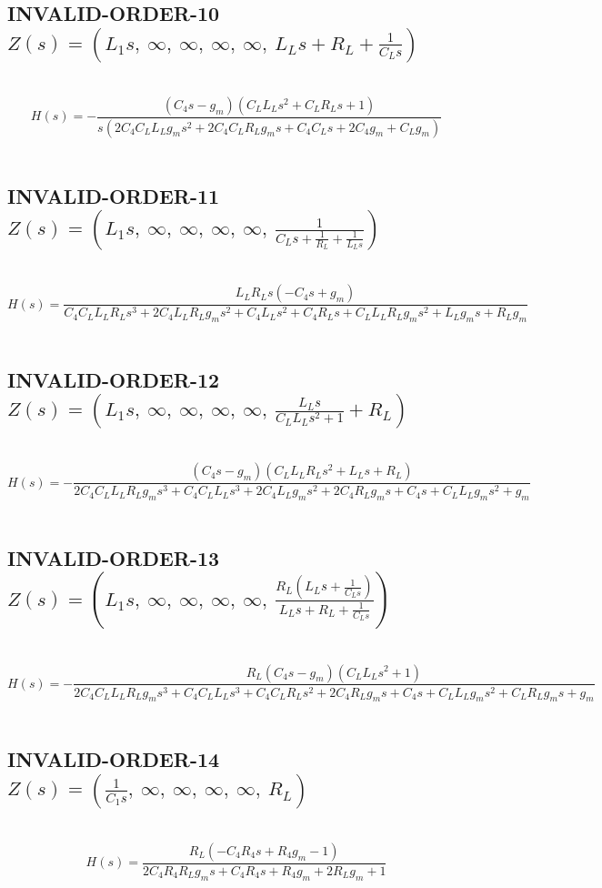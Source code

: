 \documentclass{article}
\begin{document}
\subsection{INVALID-ORDER-10 $Z(s) = \left( L_{1} s, \  \infty, \  \infty, \  \infty, \  \infty, \  L_{L} s + R_{L} + \frac{1}{C_{L} s}\right)$ } \ 
\textbf{\[H(s) = - \frac{\left(C_{4} s - g_{m}\right) \left(C_{L} L_{L} s^{2} + C_{L} R_{L} s + 1\right)}{s \left(2 C_{4} C_{L} L_{L} g_{m} s^{2} + 2 C_{4} C_{L} R_{L} g_{m} s + C_{4} C_{L} s + 2 C_{4} g_{m} + C_{L} g_{m}\right)}\] } \ 
\subsection{INVALID-ORDER-11 $Z(s) = \left( L_{1} s, \  \infty, \  \infty, \  \infty, \  \infty, \  \frac{1}{C_{L} s + \frac{1}{R_{L}} + \frac{1}{L_{L} s}}\right)$ } \ 
\textbf{\[H(s) = \frac{L_{L} R_{L} s \left(- C_{4} s + g_{m}\right)}{C_{4} C_{L} L_{L} R_{L} s^{3} + 2 C_{4} L_{L} R_{L} g_{m} s^{2} + C_{4} L_{L} s^{2} + C_{4} R_{L} s + C_{L} L_{L} R_{L} g_{m} s^{2} + L_{L} g_{m} s + R_{L} g_{m}}\] } \ 
\subsection{INVALID-ORDER-12 $Z(s) = \left( L_{1} s, \  \infty, \  \infty, \  \infty, \  \infty, \  \frac{L_{L} s}{C_{L} L_{L} s^{2} + 1} + R_{L}\right)$ } \ 
\textbf{\[H(s) = - \frac{\left(C_{4} s - g_{m}\right) \left(C_{L} L_{L} R_{L} s^{2} + L_{L} s + R_{L}\right)}{2 C_{4} C_{L} L_{L} R_{L} g_{m} s^{3} + C_{4} C_{L} L_{L} s^{3} + 2 C_{4} L_{L} g_{m} s^{2} + 2 C_{4} R_{L} g_{m} s + C_{4} s + C_{L} L_{L} g_{m} s^{2} + g_{m}}\] } \ 
\subsection{INVALID-ORDER-13 $Z(s) = \left( L_{1} s, \  \infty, \  \infty, \  \infty, \  \infty, \  \frac{R_{L} \left(L_{L} s + \frac{1}{C_{L} s}\right)}{L_{L} s + R_{L} + \frac{1}{C_{L} s}}\right)$ } \ 
\textbf{\[H(s) = - \frac{R_{L} \left(C_{4} s - g_{m}\right) \left(C_{L} L_{L} s^{2} + 1\right)}{2 C_{4} C_{L} L_{L} R_{L} g_{m} s^{3} + C_{4} C_{L} L_{L} s^{3} + C_{4} C_{L} R_{L} s^{2} + 2 C_{4} R_{L} g_{m} s + C_{4} s + C_{L} L_{L} g_{m} s^{2} + C_{L} R_{L} g_{m} s + g_{m}}\] } \ 
\subsection{INVALID-ORDER-14 $Z(s) = \left( \frac{1}{C_{1} s}, \  \infty, \  \infty, \  \infty, \  \infty, \  R_{L}\right)$ } \ 
\textbf{\[H(s) = \frac{R_{L} \left(- C_{4} R_{4} s + R_{4} g_{m} - 1\right)}{2 C_{4} R_{4} R_{L} g_{m} s + C_{4} R_{4} s + R_{4} g_{m} + 2 R_{L} g_{m} + 1}\] } \ 
\end{document}
